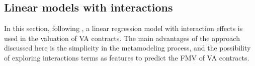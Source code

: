 \subsection{Linear models with interactions}\label{sec:linear_model}

%
%	  




In this section, following \cite{gan2018valuation}, 
a linear regression model with interaction effects is used in the valuation of VA contracts.
The main advantages of the approach discussed here is the simplicity in the metamodeling process, 
and the possibility of exploring interactions terms as features to predict the FMV of VA contracts. 

